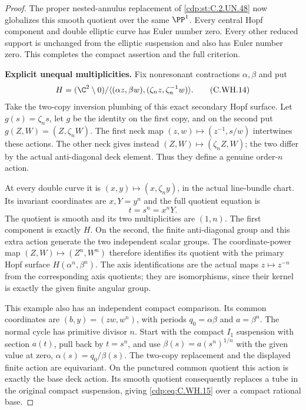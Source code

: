 \begin{proof}
The proper nested-annulus
replacement of \ref{cdp:st:C.2.UN.48} now
globalizes this smooth quotient
over the same $\PP^1$.
Every central Hopf component
and double elliptic curve
has Euler number zero.
Every other reduced support
is unchanged from the elliptic
suspension and also has Euler
number zero. This completes
the compact assertion and
the full criterion.

\par\medskip\noindent\textbf{Explicit unequal multiplicities.}
Fix nonresonant contractions
$\alpha,\beta$ and put
\[
 H=(\C^2\setminus0)/
  \langle(\alpha z,\beta w),
              (\zeta_n z,\zeta_n^{-1}w)\rangle .
\tag{C.WH.14}\label{cdp:eq:C.WH.14}
\]
Take the two-copy inversion
plumbing of this exact secondary
Hopf surface. Let $g(s)=\zeta_n s$,
let $g$ be the identity on the
first copy, and on the second
put $g(Z,W)=(Z,\zeta_n W)$.
The first neck map
$(z,w)\mapsto(z^{-1},s/w)$
intertwines these actions.
The other neck gives instead
$(Z,W)\mapsto(\zeta_n Z,W)$;
the two differ by the actual
anti-diagonal deck element.
Thus they define a genuine
order-$n$ action.

At every double curve it is
$(x,y)\mapsto(x,\zeta_n y)$,
in the actual line-bundle chart.
Its invariant coordinates are
$x,Y=y^n$ and the full quotient
equation is
\[
                              t=s^n=x^nY .
\tag{C.WH.15}\label{cdp:eq:C.WH.15}
\]
The quotient is smooth and its
two multiplicities are $(1,n)$.
The first component is exactly
$H$. On the second, the finite
anti-diagonal group and this
extra action generate the two
independent scalar groups.
The coordinate-power map
$(Z,W)\mapsto(Z^n,W^n)$
therefore identifies its
quotient with the primary
Hopf surface
$H(\alpha^n,\beta^n)$.
The axis identifications are
the actual maps $z\mapsto z^{-n}$
from the corresponding axis
quotients; they are isomorphisms,
since their kernel is exactly
the given finite angular group.

This example also has an
independent compact comparison.
Its common coordinates are
$(b,y)=(zw,w^n)$, with periods
$q_0=\alpha\beta$ and
$a=\beta^n$. The normal cycle
has primitive divisor $n$.
Start with the compact $I_1$
suspension with section $a(t)$,
pull back by $t=s^n$, and use
$\beta(s)=a(s^n)^{1/n}$ with
the given value at zero,
$\alpha(s)=q_0/\beta(s)$.
The two-copy replacement and
the displayed finite action
are equivariant. On the
punctured common quotient this
action is exactly the base
deck action. Its smooth
quotient consequently replaces
a tube in the original compact
suspension, giving \eqref{cdp:eq:C.WH.15}
over a compact rational base.


\end{proof}
